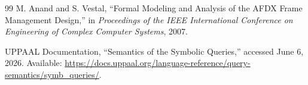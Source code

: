 \documentclass[12pt,a4paper]{article}
\begin{document}
\begin{thebibliography}{99}
M. Anand and S. Vestal, ``Formal Modeling and Analysis of the AFDX Frame Management Design,'' in \textit{Proceedings of the IEEE International Conference on Engineering of Complex Computer Systems}, 2007.

UPPAAL Documentation, ``Semantics of the Symbolic Queries,'' accessed June 6, 2026. Available: \url{https://docs.uppaal.org/language-reference/query-semantics/symb_queries/}.

\end{thebibliography}
\end{document}
